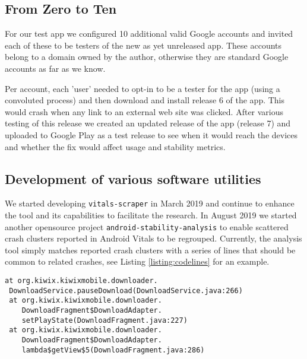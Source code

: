 \subsection{From Zero to Ten}
For our test app we configured 10 additional valid Google accounts and invited each of these to be testers of the new as yet unreleased app. These accounts belong to a domain owned by the author, otherwise they are standard Google accounts as far as we know.

Per account, each 'user' needed to opt-in to be a tester for the app (using a convoluted process) and then download and install release 6 of the app. This would crash when any link to an external web site was clicked. After various testing of this release we created an updated release of the app (release 7) and uploaded to Google Play as a test release to see when it would reach the devices and whether the fix would affect usage and stability metrics.

\subsection{Development of various software utilities}
We started developing \texttt{vitals-scraper}\cite{vitals_scraper_github_package} in March 2019 and continue to enhance the tool and its capabilities to facilitate the research. In August 2019 we started another opensource project \texttt{android-stability-analysis}\cite{android-stability-analysis} to enable scattered crash clusters reported in Android Vitals to be regrouped. Currently, the analysis tool simply matches reported crash clusters with a series of lines that should be common to related crashes, see Listing \ref{listing:codelines}  for an example.

\begin{lstlisting}[caption=Example of lines to match,label=listing:codelines]
at org.kiwix.kiwixmobile.downloader.
 DownloadService.pauseDownload(DownloadService.java:266)
 at org.kiwix.kiwixmobile.downloader.
    DownloadFragment$DownloadAdapter.
    setPlayState(DownloadFragment.java:227)
 at org.kiwix.kiwixmobile.downloader.
    DownloadFragment$DownloadAdapter.
    lambda$getView$5(DownloadFragment.java:286)
\end{lstlisting}



